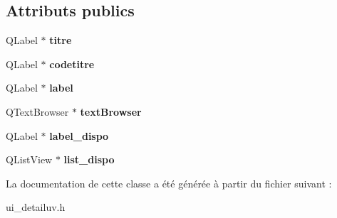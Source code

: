\subsection*{Attributs publics}
\begin{DoxyCompactItemize}
\item 
\hypertarget{class_ui__detailuv_a2ea14ca970804051281aed9e8f3d5718}{Q\+Label $\ast$ {\bfseries titre}}\label{class_ui__detailuv_a2ea14ca970804051281aed9e8f3d5718}

\item 
\hypertarget{class_ui__detailuv_ac582115f229620099ac17dc4938711b0}{Q\+Label $\ast$ {\bfseries codetitre}}\label{class_ui__detailuv_ac582115f229620099ac17dc4938711b0}

\item 
\hypertarget{class_ui__detailuv_a37fcde4804264386d9cba8c58361eae1}{Q\+Label $\ast$ {\bfseries label}}\label{class_ui__detailuv_a37fcde4804264386d9cba8c58361eae1}

\item 
\hypertarget{class_ui__detailuv_a9c24372971b586b443678bcc708e6f5a}{Q\+Text\+Browser $\ast$ {\bfseries text\+Browser}}\label{class_ui__detailuv_a9c24372971b586b443678bcc708e6f5a}

\item 
\hypertarget{class_ui__detailuv_a1c7a4132a6949d6dff1aa700e9d51302}{Q\+Label $\ast$ {\bfseries label\+\_\+dispo}}\label{class_ui__detailuv_a1c7a4132a6949d6dff1aa700e9d51302}

\item 
\hypertarget{class_ui__detailuv_a4855d8d6473d696c752097918082ce11}{Q\+List\+View $\ast$ {\bfseries list\+\_\+dispo}}\label{class_ui__detailuv_a4855d8d6473d696c752097918082ce11}

\end{DoxyCompactItemize}


La documentation de cette classe a été générée à partir du fichier suivant \+:\begin{DoxyCompactItemize}
\item 
ui\+\_\+detailuv.\+h\end{DoxyCompactItemize}

